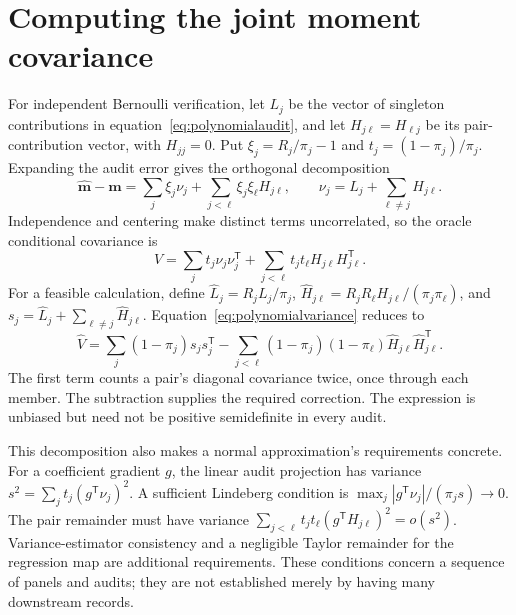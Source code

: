 \section{Computing the joint moment covariance}\label{app:momentvariance}
For independent Bernoulli verification, let $L_j$ be the vector of
singleton contributions in equation~\eqref{eq:polynomialaudit}, and let
$H_{j\ell}=H_{\ell j}$ be its pair-contribution vector, with $H_{jj}=0$.
Put $\xi_j=R_j/\pi_j-1$ and $t_j=(1-\pi_j)/\pi_j$. Expanding the audit
error gives the orthogonal decomposition
\[
\widehat{\boldsymbol m}-\boldsymbol m
=\sum_j\xi_j\nu_j+\sum_{j<\ell}\xi_j\xi_\ell H_{j\ell},
\qquad \nu_j=L_j+\sum_{\ell\ne j}H_{j\ell}.
\]
Independence and centering make distinct terms uncorrelated, so the oracle
conditional covariance is
\[
V=\sum_jt_j\nu_j\nu_j^{\mathsf T}
 +\sum_{j<\ell}t_jt_\ell H_{j\ell}H_{j\ell}^{\mathsf T}.
\]
For a feasible calculation, define
$\widehat L_j=R_jL_j/\pi_j$,
$\widehat H_{j\ell}=R_jR_\ell H_{j\ell}/(\pi_j\pi_\ell)$, and
$s_j=\widehat L_j+\sum_{\ell\ne j}\widehat H_{j\ell}$.
Equation~\eqref{eq:polynomialvariance} reduces to
\[
\widehat V=\sum_j(1-\pi_j)s_js_j^{\mathsf T}
 -\sum_{j<\ell}(1-\pi_j)(1-\pi_\ell)
          \widehat H_{j\ell}\widehat H_{j\ell}^{\mathsf T}.
\]
The first term counts a pair's diagonal covariance twice, once through each
member. The subtraction supplies the required correction. The expression
is unbiased but need not be positive semidefinite in every audit.

This decomposition also makes a normal approximation's requirements
concrete. For a coefficient gradient $g$, the linear audit projection has
variance $s^2=\sum_jt_j(g^{\mathsf T}\nu_j)^2$. A sufficient Lindeberg
condition is
$\max_j|g^{\mathsf T}\nu_j|/(\pi_js)\to0$. The pair remainder must have
variance $\sum_{j<\ell}t_jt_\ell(g^{\mathsf T}H_{j\ell})^2=o(s^2)$.
Variance-estimator consistency and a negligible Taylor remainder for the
regression map are additional requirements. These conditions concern a
sequence of panels and audits; they are not established merely by having
many downstream records.
